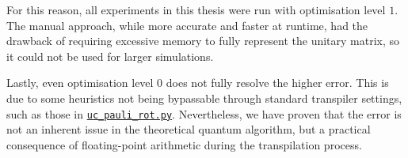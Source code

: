 For this reason, all experiments in this thesis were run with optimisation level $1$.
The manual approach, while more accurate and faster at runtime, had the drawback of requiring excessive memory to fully represent the unitary matrix, so it could not be used for larger simulations.

Lastly, even optimisation level 0 does not fully resolve the higher error. This is due to some heuristics not being bypassable through standard transpiler settings, such as those in \href{https://github.com/Qiskit/qiskit/blob/main/qiskit/circuit/library/generalized_gates/uc_pauli_rot.py}{\texttt{uc\_pauli\_rot.py}}.
Nevertheless, we have proven that the error is not an inherent issue in the theoretical quantum algorithm, but a practical consequence of floating-point arithmetic during the transpilation process.